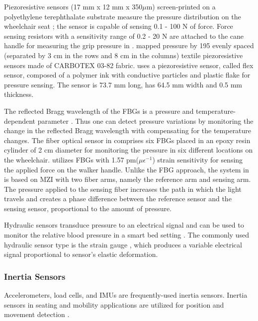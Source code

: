Piezoresistive sensors (17 mm x 12 mm x 350$\mu$m) screen-printed on a polyethylene terephthalate substrate measure the pressure distribution on the wheelchair seat \parencite{ahmad_screen-printed_2019}; the sensor is capable of sensing 0.1 - 100 N of force. Force sensing resistors with a sensitivity range of 0.2 - 20 N are attached to the cane handle for measuring the grip pressure in \textcite{wade_feasibility_2019}.\textcite{laurino_smart_2020}  mapped pressure by 195 evenly spaced (separated by 3 cm in the rows and 8 cm in the columns) textile piezoresistive sensors made of CARBOTEX 03-82 fabric. \textcite{hu_smart_2020} uses a piezoresistive sensor, called flex sensor, composed of a  polymer ink with conductive particles and plastic flake for pressure sensing. The sensor is 73.7 mm long, has 64.5 mm width and 0.5 mm thickness.

The reflected Bragg wavelength of the FBGs is a pressure and temperature-dependent parameter \parencite{tavares_wheelchair_2020}. Thus one can detect pressure variations by monitoring the change in the reflected Bragg wavelength with compensating for the temperature changes. The fiber optical sensor in \textcite{tavares_wheelchair_2020} comprises six FBGs placed in an epoxy resin cylinder of 2 cm diameter for monitoring the pressure in six different locations on the wheelchair. \textcite{leal-junior_plane-by-plane_2019} utilizes FBGs with 1.57   pm($\mu\epsilon^{-1}$) strain sensitivity for sensing the applied force on the walker handle. Unlike the FBG approach, the system in \textcite{wang_noninvasive_2020} is based on MZI with two fiber arms, namely the reference arm and sensing arm. The pressure applied to the sensing fiber increases the path in which the light travels and creates a phase difference between the reference sensor and the sensing sensor, proportional to the amount of pressure.

Hydraulic sensors transduce pressure to an electrical signal and can be used to monitor the relative blood pressure in a smart bed setting \parencite{su_monitoring_2019}. The commonly used hydraulic sensor type is the strain gauge \parencite{waltisberg_detecting_2017}, which produces a variable electrical signal proportional to sensor's elastic deformation.


\subsubsection{Inertia Sensors}

Accelerometers, load cells, and IMUs are frequently-used inertia sensors. Inertia sensors in seating and mobility applications are utilized for position and movement detection \parencite{laurino_smart_2020,viegas_monitoring_2018,wade_feasibility_2019}.

